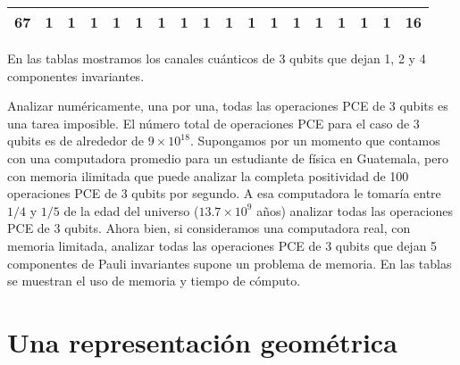 \begin{table}[h!]
{\begin{tabular}{|P{0.6cm}|P{0.65cm}|P{0.65cm}|P{0.65cm}|P{0.65cm}|P{0.65cm}|P{0.65cm}|P{0.65cm}|P{0.65cm}|P{0.65cm}|P{0.65cm}|P{0.65cm}|P{0.65cm}|P{0.65cm}|P{0.65cm}|P{0.65cm}|P{0.65cm}|P{2.9cm}|}
\textbf{67}                        & 1                     & 1                     & 1                     & 1                     & 1                     & 1                     & 1                     & 1                     & 1                     & 1                     & 1                     & 1                     & 1                     & 1                     & 1                     & 1                     & 16                    \\ \hline
\end{tabular}
}
\end{table}

En las tablas  mostramos los canales cuánticos de 3
qubits que dejan 1, 2 y 4 componentes invariantes. 
 
Analizar numéricamente, una por una, todas las operaciones PCE de 3 qubits 
es una tarea imposible. El número total de operaciones PCE para el caso 
de 3 qubits es de alrededor de $9\times10^{18}$. Supongamos por un momento
que contamos con una computadora promedio para un estudiante de física
en Guatemala, pero con memoria ilimitada que puede analizar 
la completa positividad de 100 operaciones PCE de 3 qubits por segundo. A esa 
computadora le tomaría entre $1/4$ y $1/5$ de la edad del universo 
($13.7\times10^9$ años) analizar todas las operaciones PCE de 3 qubits.
Ahora bien, si consideramos una computadora real, con memoria limitada, 
analizar todas las operaciones PCE de 3 qubits que dejan 
5 componentes de Pauli invariantes supone un problema de memoria. En las
tablas  se muestran el uso de memoria y tiempo de cómputo.

\noindent
{}

\noindent
{}

\section{Una representación geométrica}\label{sec:ch3_geometric_representation}

